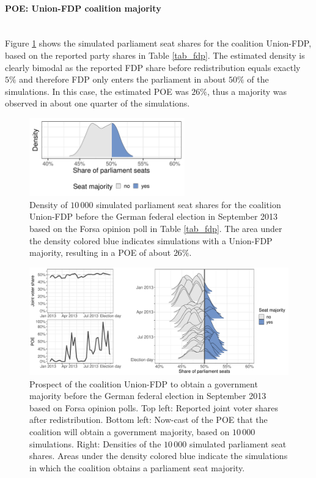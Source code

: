 \documentclass[smallextended]{svjour3}      %
\begin{document}
\paragraph{POE: Union-FDP coalition majority} \ \\

Figure \ref{fig:seatDist} shows the simulated parliament seat shares for the
coalition Union-FDP, based on the reported party shares in Table \ref{tab_fdp}.
The estimated density is clearly bimodal as the reported FDP share before
redistribution equals exactly $5\%$ and therefore FDP only enters the parliament
in about $50\%$ of the simulations. In this case, the estimated POE was $26\%$,
thus a majority was observed in about one quarter of the simulations. \\

\begin{figure}[H]\centering
\includegraphics[width=0.6\textwidth]{figures/2013_forsa_cdufdp_lastPreelectionPoll.pdf}
\caption{Density of $10\,000$ simulated parliament seat shares for the coalition
Union-FDP before the German federal election in September 2013 based on the Forsa
opinion poll in Table \ref{tab_fdp}. The area under the density colored blue
indicates simulations with a Union-FDP majority, resulting in a
POE of about $26\%$.
\label{fig:seatDist}
}
\end{figure}

\begin{figure}[H]\centering
\includegraphics[width=1\textwidth]{figures/cdufdp_2013_joint.pdf}
\caption{Prospect of the coalition Union-FDP to obtain a government majority before the
German federal election in September 2013 based on Forsa opinion polls.
Top left: Reported joint voter shares after redistribution.
Bottom left: Now-cast of the POE that the coalition will obtain a government
majority, based on $10\,000$ simulations.
Right: Densities of the $10\,000$ simulated parliament seat shares. Areas under
the density colored blue indicate the simulations in which the coalition
obtains a parliament seat majority.
\label{fig:seatDist_time}
}
\end{figure}
\end{document}
